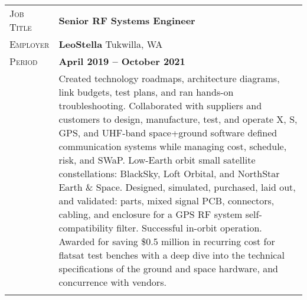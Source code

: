 \documentclass[a4paper, oneside, final]{scrartcl}
\newcommand{\gray}{\rowcolor[gray]{.90}} %
\begin{document}
\begin{center}
\begin{tabularx}{0.97\linewidth}{>{\raggedleft\scshape}p{2cm}X}
\gray Job Title & \textbf{Senior RF Systems Engineer}\\
\gray Employer & \textbf{LeoStella} \hfill Tukwilla, WA\\
\gray Period & \textbf{April 2019 -- October 2021}\\
&
\vspace{-0.15 cm}
Created technology roadmaps, architecture diagrams, link budgets, test plans, and ran hands-on troubleshooting. Collaborated with suppliers and customers to design, manufacture, test, and operate X, S, GPS, and UHF-band space+ground software defined communication systems while managing cost, schedule, risk, and SWaP.  Low-Earth orbit small satellite constellations: BlackSky, Loft Orbital, and NorthStar Earth \& Space.
\newline
\newline
Designed, simulated, purchased, laid out, and validated: parts, mixed signal PCB, connectors, cabling, and enclosure for a GPS RF system self-compatibility filter.  Successful in-orbit operation.
\newline
\newline
Awarded for saving \$0.5 million in recurring cost for flatsat test benches with a deep dive into the technical specifications of the ground and space hardware, and concurrence with vendors.
\\
\\
\end{tabularx}


\end{center}
\end{document}
